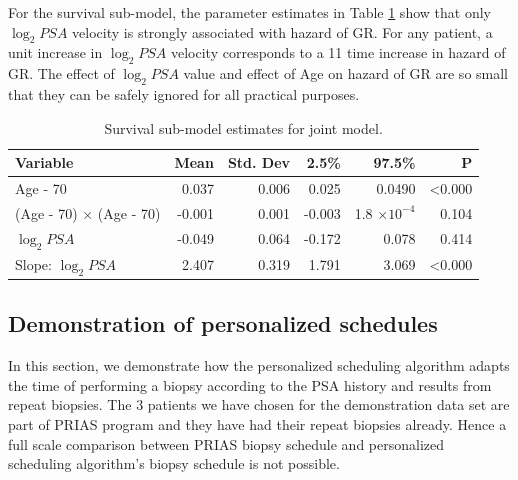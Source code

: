 For the survival sub-model, the parameter estimates in Table \ref{tab : PSA_survival} show that only $\log_2 PSA$ velocity is strongly associated with hazard of GR. For any patient, a unit increase in $\log_2 PSA$ velocity corresponds to a 11 time increase in hazard of GR. The effect of $\log_2 PSA$ value and effect of Age on hazard of GR are so small that they can be safely ignored for all practical purposes.

\begin{table}[!htb]
\centering
\caption{Survival sub-model estimates for joint model.}
\captionsetup{justification=centering}
\label{tab : PSA_survival}
\begin{tabular}{@{}lrrrrr@{}}
\toprule
Variable                      & Mean   & Std. Dev & 2.5\%  & 97.5\%                 & P              \\ \midrule
Age - 70                      & 0.037 & 0.006 & 0.025 & 0.0490                  & \textless0.000 \\
(Age - 70) $\times$ (Age - 70) & -0.001 & 0.001 & -0.003 & 1.8 $\times 10^{-4}$ & 0.104          \\
$\log_2 PSA$                  & -0.049 & 0.064 & -0.172 & 0.078 & 0.414         \\
Slope: $\log_2 PSA$           & 2.407 & 0.319 & 1.791 & 3.069 & \textless0.000 \\ \bottomrule
\end{tabular}
\end{table}

\subsection{Demonstration of personalized schedules}
In this section, we demonstrate how the personalized scheduling algorithm adapts the time of performing a biopsy according to the PSA history and results from repeat biopsies. The 3 patients we have chosen for the demonstration data set are part of PRIAS program and they have had their repeat biopsies already. Hence a full scale comparison between PRIAS biopsy schedule and personalized scheduling algorithm's biopsy schedule is not possible.\\

